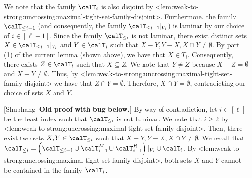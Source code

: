 \documentclass{article}
\def\Cref#1{<#1>}%
\newcommand{\maximalTightSetFamily}[1]{\ensuremath{\calT_{#1}}\xspace}
\newcommand{\tightSetFamily}[1]{\ensuremath{T_{#1}}\xspace}
\newcommand{\cumulativeMaximalTightSetFamily}[1]{\ensuremath{\calT_{\leq #1}}}
\newcommand{\projCumulativeMaximalTightSetFamily}[2]{\ensuremath{\calT_{\leq #1}|_{V_{#2}}}}
\newcommand{\shubhang}[1]{{\color{blue}[{\tiny Shubhang: \bf #1}]\marginpar{\color{blue}*}}}
\begin{document}
        We note that the family $\maximalTightSetFamily{i}$ is also disjoint by \Cref{lem:weak-to-strong:uncrossing:maximal-tight-set-family-disjoint}. Furthermore, the family $\cumulativeMaximalTightSetFamily{i-1}$ (and consequently, the family  $\cumulativeMaximalTightSetFamily{i-1}|_{V_i}$) is laminar by our choice of $i\in[\ell - 1]$. Since the family $\cumulativeMaximalTightSetFamily{i}$ is not laminar, there exist distinct sets $X \in \projCumulativeMaximalTightSetFamily{i-1}{i}$ and $Y \in \maximalTightSetFamily{i}$ such that $X - Y, Y - X, X \cap Y \not = \emptyset$. By part (1) of the current lemma (shown above), we have that $X \in \tightSetFamily{i}$. Consequently, there exists $Z\in \maximalTightSetFamily{i}$ such that $X \subseteq Z$. We note that $Y \not = Z$ because $X -Z=\emptyset$ and $X - Y \not = \emptyset$. Thus, by \Cref{lem:weak-to-strong:uncrossing:maximal-tight-set-family-disjoint} we have that $Z\cap Y = \emptyset$. Therefore, $X\cap Y = \emptyset$, contradicting our choice of sets $X$ and $Y$.

        \iffalse
        \shubhang{Old proof with bug below.} By way of contradiction, let $i \in [\ell]$ be the least index such that $\cumulativeMaximalTightSetFamily{i}$ is not laminar. We note that $i \geq 2$ by \Cref{lem:weak-to-strong:uncrossing:maximal-tight-set-family-disjoint}. Then, there exist two sets $X, Y \in \cumulativeMaximalTightSetFamily{i}$ such that $X- Y, Y - X, X\cap Y \not = \emptyset$. We recall that $\cumulativeMaximalTightSetFamily{i} = \left(\cumulativeMaximalTightSetFamily{i-1} \cup \maximalTightSetFamily{i-1}^M \cup \maximalTightSetFamily{i-1}^R\right)|_{V_i}\cup \maximalTightSetFamily{i}$. By \Cref{lem:weak-to-strong:uncrossing:maximal-tight-set-family-disjoint}, both sets $X$ and $Y$ cannot be contained in the family $\maximalTightSetFamily{i}$. 
\end{document}
